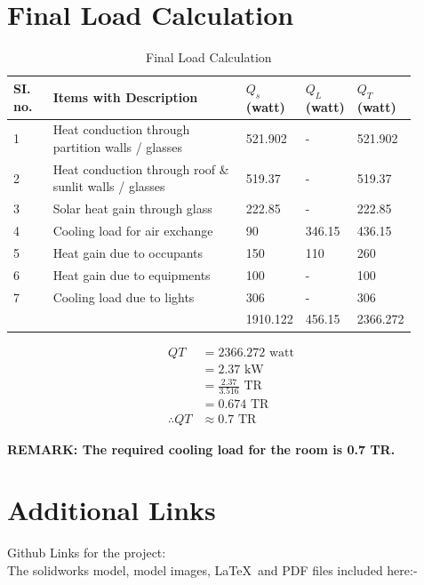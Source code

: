 \documentclass{article}
\begin{document}
    \section{Final Load Calculation}
    \begin{table}[ht]
      \centering
      \begin{adjustbox}{width=\textwidth}
      \begin{tabularx}{\linewidth}{p{0.10\linewidth} p{0.5\linewidth} p{0.10\linewidth} p{0.10\linewidth} p{0.10\linewidth}}
          \hline
          \textbf{SI. no.} & \textbf{Items with Description} & \textbf{$Q_s$ (watt)} & \textbf{$Q_L$ (watt)} & \textbf{$Q_T$ (watt)} \\
          \hline
          1 & Heat conduction through partition walls / glasses & 521.902 & - & 521.902 \\
          2 & Heat conduction through roof \& sunlit walls / glasses & 519.37 & - & 519.37 \\
          3 & Solar heat gain through glass  & 222.85 & - & 222.85 \\
          4 & Cooling load for air exchange & 90 & 346.15 & 436.15 \\
          5 & Heat gain due to occupants & 150 & 110 & 260 \\
          6 & Heat gain due to equipments & 100 & - & 100 \\
          7 & Cooling load due to lights & 306 & - & 306 \\
          \hline
          && 1910.122 & 456.15 & 2366.272 \\
      \end{tabularx}
      \end{adjustbox}
      \caption{Final Load Calculation}
      \label{tab:Final Calculation}
      \end{table}
 
      \begin{align*}
        QT &= 2366.272 \text{ watt} \\
        &= 2.37 \text{ kW} \\
        &= \frac{2.37}{3.516} \text{ TR} \\
        &= 0.674 \text{ TR} \\
        \therefore QT &\approx 0.7 \text{ TR}
      \end{align*}

      \textbf{REMARK: The required cooling load for the room is 0.7 TR.}

      \section{Additional Links}
      Github Links for the project: \\
      The solidworks model, model images, \LaTeX\,  and PDF files included here:- \\ 
      
\end{document}
